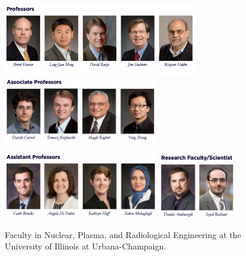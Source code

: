 \begin{figure}[htbp]
        \begin{center}
                \includegraphics[width=0.75\textwidth]{./images/full.png}
                \includegraphics[width=0.6\textwidth]{./images/associate.png}
                \includegraphics[width=0.6\textwidth]{./images/assistant.png}
                \includegraphics[width=0.3\textwidth]{./images/research.png}
        \end{center}
        \caption{Faculty in Nuclear, Plasma, and Radiological Engineering  at 
        the University of Illinois at Urbana-Champaign.}
        \label{fig:faculty}
\end{figure}


